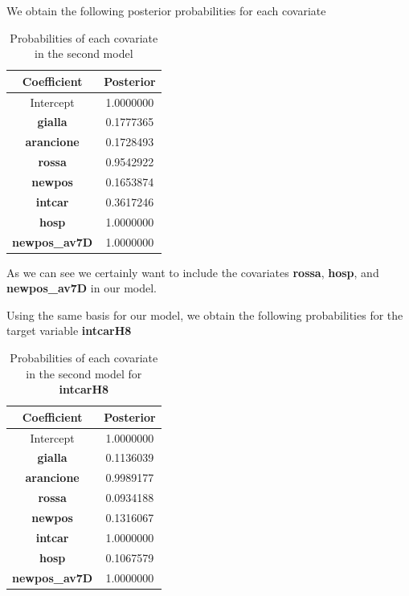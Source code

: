 \documentclass[12pt,a4paper]{article}
\theoremstyle{definition}
\theoremstyle{remark}
\begin{document}
We obtain the following posterior probabilities for each covariate
\begin{table}[htb!]
	\centering
	\begin{tabular}{|c|c|}
		\hline
		Coefficient          & Posterior \\ \hline
		Intercept          & 1.0000000                   \\ \hline
		\textbf{gialla}    & 0.1777365                  \\ \hline
		\textbf{arancione} & 0.1728493                   \\ \hline
		\textbf{rossa}     & 0.9542922                     \\ \hline
		\textbf{newpos}    & 0.1653874                  \\ \hline
		\textbf{intcar}    & 0.3617246                \\ \hline
		\textbf{hosp}      & 1.0000000        \\ \hline
			\textbf{newpos\_av7D}      & 1.0000000        \\ \hline
	\end{tabular}
	\caption{Probabilities of each covariate in the second model}
\end{table}


As we can see we certainly want to include the covariates \textbf{rossa}, \textbf{hosp}, and \textbf{newpos\_av7D} in our model. 

Using the same basis for our model, we obtain the following probabilities for the target variable \textbf{intcarH8}
\begin{table}[htb!]
	\centering
	\begin{tabular}{|c|c|}
		\hline
		Coefficient          & Posterior \\ \hline
		Intercept          & 1.0000000                   \\ \hline
		\textbf{gialla}    &0.1136039                 \\ \hline
		\textbf{arancione} & 0.9989177               \\ \hline
		\textbf{rossa}     &0.0934188                 \\ \hline
		\textbf{newpos}    &  0.1316067             \\ \hline
		\textbf{intcar}    & 1.0000000            \\ \hline
		\textbf{hosp}      &0.1067579       \\ \hline
		\textbf{newpos\_av7D}      & 1.0000000        \\ \hline
	\end{tabular}
	\caption{Probabilities of each covariate in the second model for \textbf{intcarH8}}
\end{table}
\end{document}
